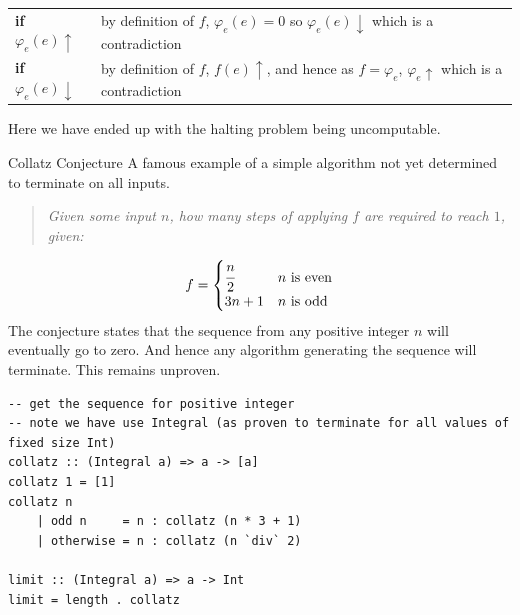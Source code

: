 \begin{center}
    \begin{tabular}{l p{}}
        \textbf{if $\varphi_e(e)\uparrow$} & by definition of $f$, $\varphi_e(e) = 0$ so $\varphi_e(e)\downarrow$ which is a contradiction \\
        \textbf{if $\varphi_e(e)\downarrow$} & by definition of $f$, $f(e)\uparrow$, and hence as $f = \varphi_e$, $\varphi_e\uparrow$ which is a contradiction \\
    \end{tabular}
\end{center}

Here we have ended up with the halting problem being uncomputable.

\begin{sidenotebox}{Collatz Conjecture}
    A famous example of a simple algorithm not yet determined to terminate on all inputs.
    \begin{quote}
        \textit{Given some input $n$, how many steps of applying $f$ are required to reach $1$, given:}
    \end{quote}
    \[f = \begin{cases}
        \cfrac{n}{2} & n \text{ is even} \\
        3n + 1 & n \text{ is odd} \\
    \end{cases}\]
    The conjecture states that the sequence from any positive integer $n$ will eventually go to zero. And hence any algorithm generating the sequence will terminate. This remains unproven.
    \begin{verbatim}
-- get the sequence for positive integer
-- note we have use Integral (as proven to terminate for all values of fixed size Int)
collatz :: (Integral a) => a -> [a]
collatz 1 = [1]
collatz n 
    | odd n     = n : collatz (n * 3 + 1)
    | otherwise = n : collatz (n `div` 2)

limit :: (Integral a) => a -> Int
limit = length . collatz
    \end{verbatim}
\end{sidenotebox}

